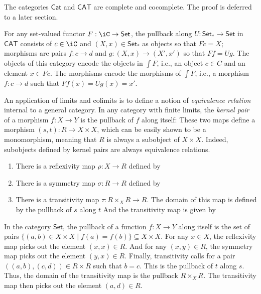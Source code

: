 \documentclass{amsart}
\begin{document}
The categories $\mathsf{Cat}$ and $\mathsf{CAT}$ are complete and cocomplete.
The proof is deferred to a later section.

\begin{rmk}
  For any set-valued functor $F : \iC \to \mathsf{Set}$, the pullback along $U : \mathsf{Set}_{*} \to \mathsf{Set}$ in $\mathsf{CAT}$ consists of $c \in \iC$ and $(X, x) \in \mathsf{Set}_{*}$
  as objects so that $Fc = X$; morphisms are pairs $f : c \to d$ and $g : (X, x) \to (X', x')$ so that $Ff = Ug$.
  The objects of this category encode the objects in $\int F$, i.e., an object $c \in C$ and an element $x \in Fc$.
  The morphisms encode the morphisms of $\int F$, i.e., a morphism $f : c \to d$ such that $Ff(x) = Ug(x) = x'$.
  
\end{rmk}

An application of limits and colimits is to define a notion of \emph{equivalence relation} internal to a general category.
In any category with finite limits, the \emph{kernel pair} of a morphism $f : X \to Y$ is the pullback of $f$ along itself: 
These two maps define a morphism $(s,t) : R \to X \times X$, which can be easily shown to be a monomorphism, meaning that $R$ is always a subobject of $X \times X$.
Indeed, subobjects defined by kernel pairs are always equivalence relations.
\begin{enumerate}
\item There is a reflexivity map $\rho : X \to R$ defined by 
\item There is a symmetry map $\sigma : R \to R$ defined by 
\item There is a transitivity map $\tau : R \times_{X} R \to R$.
  The domain of this map is defined by the pullback of $s$ along $t$ 
  And the transitivity map is given by 
\end{enumerate}

In the category $\mathsf{Set}$, the pullback of a function $f : X \to Y$ along itself is the set of pairs $\{(a, b) \in X \times X \mid f(a) = f(b)\} \subseteq X \times X$.
For any $x \in X$, the reflexivity map picks out the element $(x, x) \in R$.
And for any $(x, y) \in R$, the symmetry map picks out the element $(y, x) \in R$.
Finally, transitivity calls for a pair $((a, b), (c, d)) \in R \times R$ such that $b = c$.
This is the pullback of $t$ along $s$.
Thus, the domain of the transitivity map is the pullback $R \times_{X} R$.
The transitivity map then picks out the element $(a, d) \in R$.
\end{document}
